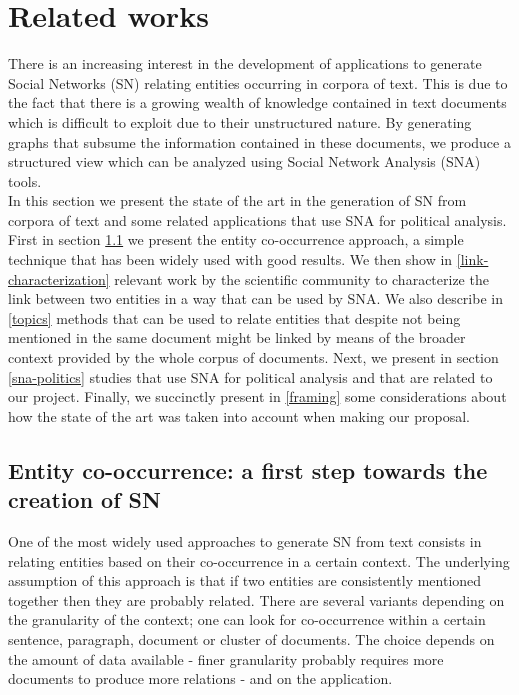 \section{Related works}\label{sec:related-works}

There is an increasing interest in the development of applications to generate Social Networks (SN) relating entities occurring in corpora of text. This is due to the fact that there is a growing wealth of knowledge contained in text documents which is difficult to exploit due to their unstructured nature. By generating graphs that subsume the information contained in these documents, we produce a structured view which can be analyzed using Social Network Analysis (SNA) tools. \\

In this section we present the state of the art in the generation of SN from corpora of text and some related applications that use SNA for political analysis. First in section \ref{co-occurrence} we present the entity co-occurrence approach, a simple technique that has been widely used with good results. We then show in \ref{link-characterization} relevant work by the scientific community to characterize the link between two entities in a way that can be used by SNA. We also describe in \ref{topics} methods that can be used to relate entities that despite not being mentioned in the same document might be linked by means of the broader context provided by the whole corpus of documents. Next, we present in section \ref{sna-politics} studies that use SNA for political analysis and that are related to our project. Finally, we succinctly present in \ref{framing} some considerations about how the state of the art was taken into account when making our proposal.\\

\subsection{Entity co-occurrence: a first step towards the creation of SN}\label{co-occurrence}

One of the most widely used approaches to generate SN from text consists in relating entities based on their co-occurrence in a certain context. The underlying assumption of this approach is that if two entities are consistently mentioned together then they are probably related. There are several variants depending on the granularity of the context; one can look for co-occurrence within a certain sentence, paragraph, document or cluster of documents. The choice depends on the amount of data available - finer granularity probably requires more documents to produce more relations - and on the application. \\

